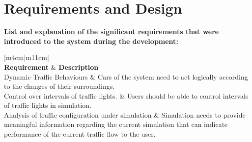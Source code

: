 \documentclass[11pt]{article}
\begin{document}
\section{Requirements and Design} %
\textbf{ List and explanation of the significant requirements that were introduced to the system during the development:}
\begin{center}
\begin{table}[!htb]
	\begin{tabular}{|m{4cm}|m{11cm}|}
		 \hline
		 \\ 
		\hline 
		 \textbf{Requirement} & \textbf{Description}\\ \hline
		 Dynamic Traffic Behaviours & Cars of the system need to act logically according to the changes of their surroundings.  \\ \hline
		 Control over intervals of traffic lights. &  Users should be able to control intervals of traffic lights in simulation. \\ \hline
		 Analysis of traffic configuration under simulation & 
Simulation needs to provide meaningful information regarding the current simulation that can indicate performance of the current traffic flow to the user.


\end{tabular}
\end{table}
\end{center}
\end{document}
